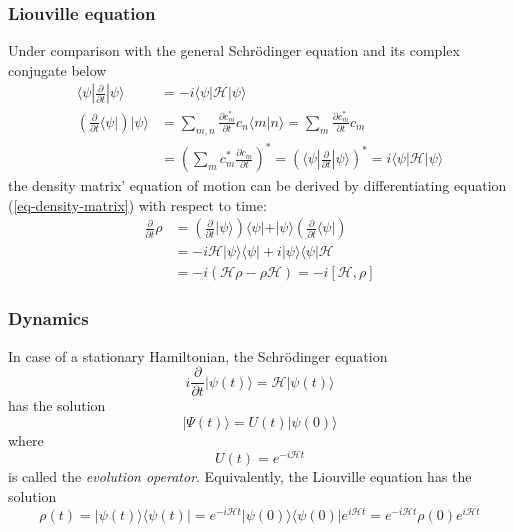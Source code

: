 \documentclass[11.5pt,a4paper]{article}
\begin{document}
\subsubsection{Liouville equation}
Under comparison with the general Schr\"odinger equation and its complex conjugate below
\begin{align}
 \langle \psi | \frac{\partial}{\partial t} |\psi\rangle  & = -i \langle \psi | \mathcal{H} |\psi\rangle \\
  \left( \frac{\partial}{\partial t} \langle \psi | \right)  |\psi\rangle
   & = \sum_{m,n} \frac{\partial c_m^*}{\partial t} c_n \langle m | n \rangle 
   =  \sum_{m} \frac{\partial c_m^*}{\partial t} c_m \\
   & = \left( \sum_{m} c_m^* \frac{\partial c_m}{\partial t}\right)^*
   = \left( \langle \psi | \frac{\partial}{\partial t} |\psi\rangle \right)^* = i \langle \psi |\mathcal{H} |\psi\rangle
\end{align}
the density matrix' equation of motion can be derived by differentiating equation (\ref{eq-density-matrix}) with respect to time:
\begin{align}
 \frac{\partial}{\partial t} \rho & = \left( \frac{\partial}{\partial t} | \psi \rangle \right) \langle \psi | + | \psi \rangle \left( \frac{\partial}{\partial t} \langle \psi | \right)  \\
  & = - i \mathcal{H} |\psi\rangle\langle\psi| + i |\psi\rangle\langle\psi| \mathcal{H}  \\
  & = -i ( \mathcal{H} \rho - \rho \mathcal{H} ) = -i [ \mathcal{H}, \rho ] 
  \label{eq-liouville}
\end{align}

\subsubsection{Dynamics}
In case of a stationary Hamiltonian, the Schr\"odinger equation 
\begin{equation}
  i \frac{\partial}{\partial t} | \psi(t) \rangle = \mathcal{H} |\psi(t) \rangle
\end{equation}
has the solution
\begin{equation}
  |\Psi(t)\rangle = U(t) | \psi(0) \rangle
\end{equation}
where 
\begin{equation}
 U(t) = e^{-i \mathcal{H} t}
  \label{eq-evolution}
\end{equation}
is called the \emph{evolution operator}.
Equivalently, the Liouville equation has the solution
\begin{equation}
 \rho(t) = |\psi(t)\rangle \langle \psi(t)| = e^{-i \mathcal{H} t} | \psi(0) \rangle \langle \psi(0) | e^{i \mathcal{H} t} = e^{-i \mathcal{H} t} \rho(0) e^{i \mathcal{H} t}
\end{equation}
\end{document}
